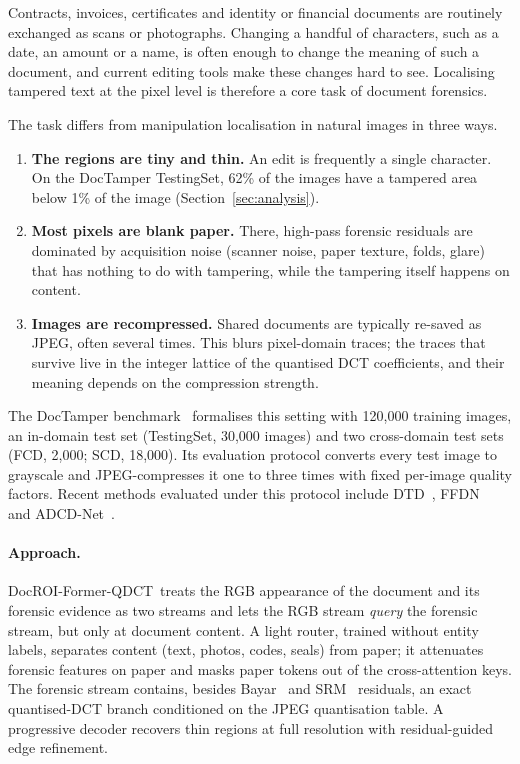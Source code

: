 \documentclass[11pt,a4paper]{article}
\newcommand{\ours}{DocROI-Former-QDCT}
\begin{document}
Contracts, invoices, certificates and identity or financial documents are routinely exchanged
as scans or photographs. Changing a handful of characters, such as a date, an amount or a name,
is often enough to change the meaning of such a document, and current editing tools make these
changes hard to see. Localising tampered text at the pixel level is therefore a core task of
document forensics.

The task differs from manipulation localisation in natural images in three ways.
\begin{enumerate}
  \item \textbf{The regions are tiny and thin.} An edit is frequently a single character. On the
        DocTamper TestingSet, 62\% of the images have a tampered area below 1\% of the image
        (Section~\ref{sec:analysis}).
  \item \textbf{Most pixels are blank paper.} There, high-pass forensic residuals are dominated by
        acquisition noise (scanner noise, paper texture, folds, glare) that has nothing to do
        with tampering, while the tampering itself happens on content.
  \item \textbf{Images are recompressed.} Shared documents are typically re-saved as JPEG, often
        several times. This blurs pixel-domain traces; the traces that survive live in the
        integer lattice of the quantised DCT coefficients, and their meaning depends on the
        compression strength.
\end{enumerate}

The DocTamper benchmark~\cite{dtd} formalises this setting with 120{,}000 training images,
an in-domain test set (TestingSet, 30{,}000 images) and two cross-domain test sets (FCD,
2{,}000; SCD, 18{,}000). Its evaluation protocol converts every test image to grayscale and
JPEG-compresses it one to three times with fixed per-image quality factors. Recent methods
evaluated under this protocol include DTD~\cite{dtd}, FFDN~\cite{ffdn} and
ADCD-Net~\cite{adcd}.

\paragraph{Approach.} \ours\ treats the RGB appearance of the document and its forensic
evidence as two streams and lets the RGB stream \emph{query} the forensic stream, but only at
document content. A light router, trained without entity labels, separates content (text,
photos, codes, seals) from paper; it attenuates forensic features on paper and masks
paper tokens out of the cross-attention keys. The forensic stream contains, besides
Bayar~\cite{bayar} and SRM~\cite{srm} residuals, an exact quantised-DCT branch conditioned on
the JPEG quantisation table. A progressive decoder recovers thin regions at full resolution
with residual-guided edge refinement.
\end{document}
